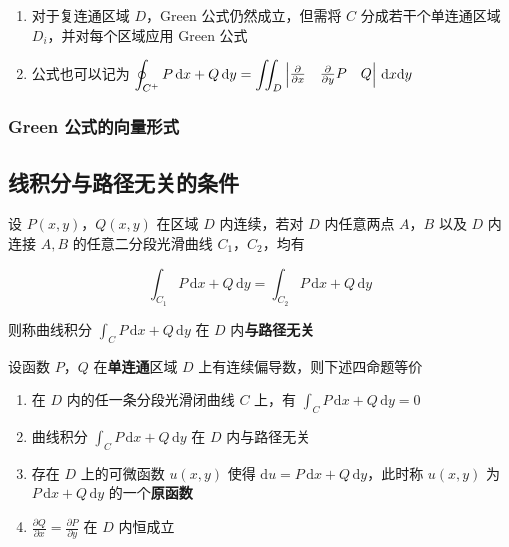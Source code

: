 \documentclass[lang = zh , final , oneside , openany , titlepage , zihao = -4 , linespread = 1.3 , baselineskip = false , cjk-font = windows , text-font = newtx , math-font = newtx , math-style = ISO , uppercase-greek = upright , integral-limits = false]{sjtureport}
\begin{document}
\begin{enumerate}
\item
  对于复连通区域 \(D\)，Green 公式仍然成立，但需将 \(C\)
  分成若干个单连通区域 \(D_i\)，并对每个区域应用 Green 公式
\item
  公式也可以记为
  \(\displaystyle\oint_{C^+} P\,\mathrm{d}x + Q\,\mathrm{d}y = \iint_D \begin{vmatrix}\frac{\partial}{\partial x}&\frac{\partial}{\partial y}\newline P&Q\end{vmatrix}\,\mathrm{d}x\mathrm{d}y\)
\end{enumerate}

\subsubsection{Green 公式的向量形式}

\subsection{线积分与路径无关的条件}

\begin{definition}
    设 \(P(x,y)\)，\(Q(x,y)\) 在区域 \(D\) 内连续，若对 \(D\) 内任意两点
\(A\)，\(B\) 以及 \(D\) 内连接 \(A,B\) 的任意二分段光滑曲线
\(C_1\)，\(C_2\)，均有

\[\int_{C_1} P\,\mathrm{d}x +Q\,\mathrm{d}y = \int_{C_2} P\,\mathrm{d}x +Q\,\mathrm{d}y\]

则称曲线积分 \(\displaystyle\int_C P\,\mathrm{d}x +Q\,\mathrm{d}y\) 在
\(D\) 内\textbf{与路径无关}
\end{definition}

\begin{theorem}
    设函数 \(P\)，\(Q\) 在\textbf{单连通}区域 \(D\)
上有连续偏导数，则下述四命题等价

\begin{enumerate}
\def\labelenumi{\arabic{enumi}.}
\item
  在 \(D\) 内的任一条分段光滑闭曲线 \(C\) 上，有
  \(\displaystyle \int_C P\,\mathrm{d}x +Q\,\mathrm{d}y = 0\)
\item
  曲线积分 \(\displaystyle \int_C P\,\mathrm{d}x +Q\,\mathrm{d}y\) 在
  \(D\) 内与路径无关
\item
  存在 \(D\) 上的可微函数 \(u(x,y)\) 使得
  \(\displaystyle \mathrm{d}u = P\,\mathrm{d}x +Q\,\mathrm{d}y\)，此时称
  \(u(x,y)\) 为 \(\displaystyle P\,\mathrm{d}x +Q\,\mathrm{d}y\)
  的一个\textbf{原函数}
\item
  \(\displaystyle \frac{\partial Q}{\partial x} = \frac{\partial P}{\partial y}\)
  在 \(D\) 内恒成立
\end{enumerate}
\end{theorem}
\end{document}
